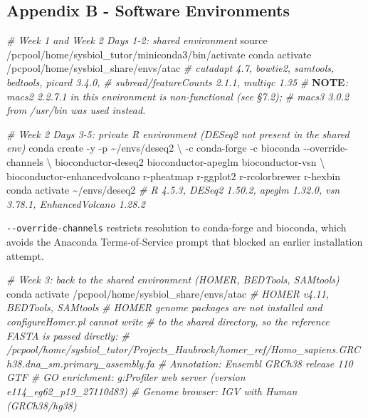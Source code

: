 \documentclass[
  11pt,
  a4paper,
]{article}
\newenvironment{Shaded}{}{}
\newcommand{\AlertTok}[1]{\textcolor[rgb]{1.00,0.00,0.00}{\textbf{#1}}}
\newcommand{\AttributeTok}[1]{\textcolor[rgb]{0.49,0.56,0.16}{#1}}
\newcommand{\BuiltInTok}[1]{\textcolor[rgb]{0.00,0.50,0.00}{#1}}
\newcommand{\CommentTok}[1]{\textcolor[rgb]{0.38,0.63,0.69}{\textit{#1}}}
\newcommand{\DataTypeTok}[1]{\textcolor[rgb]{0.56,0.13,0.00}{#1}}
\newcommand{\ExtensionTok}[1]{#1}
\newcommand{\NormalTok}[1]{#1}
\begin{document}
\hypertarget{appendix-b---software-environments}{%
\subsection{Appendix B - Software
Environments}\label{appendix-b---software-environments}}

\begin{Shaded}
\begin{Highlighting}[]
\CommentTok{\# Week 1 and Week 2 Days 1{-}2: shared environment}
\BuiltInTok{source}\NormalTok{ /pcpool/home/sysbiol\_tutor/miniconda3/bin/activate}
\ExtensionTok{conda}\NormalTok{ activate /pcpool/home/sysbiol\_share/envs/atac}
\CommentTok{\# cutadapt 4.7, bowtie2, samtools, bedtools, picard 3.4.0,}
\CommentTok{\# subread/featureCounts 2.1.1, multiqc 1.35}
\CommentTok{\# }\AlertTok{NOTE}\CommentTok{: macs2 2.2.7.1 in this environment is non{-}functional (see §7.2);}
\CommentTok{\#       macs3 3.0.2 from /usr/bin was used instead.}

\CommentTok{\# Week 2 Days 3{-}5: private R environment (DESeq2 not present in the shared env)}
\ExtensionTok{conda}\NormalTok{ create }\AttributeTok{{-}y} \AttributeTok{{-}p}\NormalTok{ \textasciitilde{}/envs/deseq2 }\DataTypeTok{\textbackslash{}}
  \AttributeTok{{-}c}\NormalTok{ conda{-}forge }\AttributeTok{{-}c}\NormalTok{ bioconda }\AttributeTok{{-}{-}override{-}channels} \DataTypeTok{\textbackslash{}}
\NormalTok{  bioconductor{-}deseq2 bioconductor{-}apeglm bioconductor{-}vsn }\DataTypeTok{\textbackslash{}}
\NormalTok{  bioconductor{-}enhancedvolcano r{-}pheatmap r{-}ggplot2 r{-}rcolorbrewer r{-}hexbin}
\ExtensionTok{conda}\NormalTok{ activate \textasciitilde{}/envs/deseq2}
\CommentTok{\# R 4.5.3, DESeq2 1.50.2, apeglm 1.32.0, vsn 3.78.1, EnhancedVolcano 1.28.2}
\end{Highlighting}
\end{Shaded}

\texttt{-\/-override-channels} restricts resolution to conda-forge and
bioconda, which avoids the Anaconda Terms-of-Service prompt that blocked
an earlier installation attempt.

\begin{Shaded}
\begin{Highlighting}[]
\CommentTok{\# Week 3: back to the shared environment (HOMER, BEDTools, SAMtools)}
\ExtensionTok{conda}\NormalTok{ activate /pcpool/home/sysbiol\_share/envs/atac}
\CommentTok{\# HOMER v4.11, BEDTools, SAMtools}
\CommentTok{\# HOMER genome packages are not installed and configureHomer.pl cannot write}
\CommentTok{\# to the shared directory, so the reference FASTA is passed directly:}
\CommentTok{\#   /pcpool/home/sysbiol\_tutor/Projects\_Haubrock/homer\_ref/Homo\_sapiens.GRCh38.dna\_sm.primary\_assembly.fa}
\CommentTok{\# Annotation: Ensembl GRCh38 release 110 GTF}
\CommentTok{\# GO enrichment: g:Profiler web server (version e114\_eg62\_p19\_27110d83)}
\CommentTok{\# Genome browser: IGV with Human (GRCh38/hg38)}
\end{Highlighting}
\end{Shaded}
\end{document}
